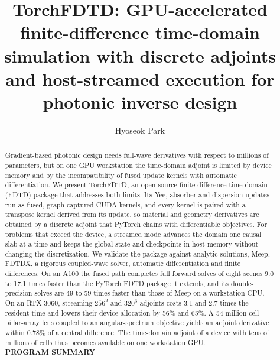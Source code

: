 \documentclass[preprint,11pt]{elsarticle}
\begin{document}
\begin{frontmatter}

\title{TorchFDTD: GPU-accelerated finite-difference time-domain simulation with discrete adjoints and host-streamed execution for photonic inverse design}

\author[cnu]{Hyoseok Park}
\address[cnu]{Department of Physics, Chungnam National University, Daejeon 34134, Republic of Korea}

\begin{abstract}
Gradient-based photonic design needs full-wave derivatives with respect to millions of parameters, but on one GPU workstation the time-domain adjoint is limited by device memory and by the incompatibility of fused update kernels with automatic differentiation. We present TorchFDTD, an open-source finite-difference time-domain (FDTD) package that addresses both limits. Its Yee, absorber and dispersion updates run as fused, graph-captured CUDA kernels, and every kernel is paired with a transpose kernel derived from its update, so material and geometry derivatives are obtained by a discrete adjoint that PyTorch chains with differentiable objectives. For problems that exceed the device, a streamed mode advances the domain one causal slab at a time and keeps the global state and checkpoints in host memory without changing the discretization. We validate the package against analytic solutions, Meep, FDTDX, a rigorous coupled-wave solver, automatic differentiation and finite differences. On an A100 the fused path completes full forward solves of eight scenes 9.0 to 17.1 times faster than the PyTorch FDTD package it extends, and its double-precision solves are 49 to 59 times faster than those of Meep on a workstation CPU. On an RTX 3060, streaming $256^3$ and $320^3$ adjoints costs 3.1 and 2.7 times the resident time and lowers their device allocation by 56\% and 65\%. A 54-million-cell pillar-array lens coupled to an angular-spectrum objective yields an adjoint derivative within 0.78\% of a central difference. The time-domain adjoint of a device with tens of millions of cells thus becomes available on one workstation GPU.
\\

\noindent \textbf{PROGRAM SUMMARY}


\end{abstract}
\end{frontmatter}
\end{document}
